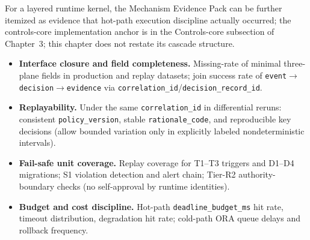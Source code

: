\documentclass[11pt,a4paper]{report}
\begin{document}
For a layered runtime kernel, the Mechanism Evidence Pack can be further itemized as evidence that hot-path execution discipline actually occurred; the controls-core implementation anchor is in the Controls-core subsection of Chapter~3; this chapter does not restate its cascade structure.
\begin{itemize}
  \item \textbf{Interface closure and field completeness.} Missing-rate of minimal three-plane fields in production and replay datasets; join success rate of \texttt{event}$\rightarrow$\texttt{decision}$\rightarrow$\texttt{evidence} via \texttt{correlation\_id}/\texttt{decision\_record\_id}.
  \item \textbf{Replayability.} Under the same \texttt{correlation\_id} in differential reruns: consistent \texttt{policy\_version}, stable \texttt{rationale\_code}, and reproducible key decisions (allow bounded variation only in explicitly labeled nondeterministic intervals).
  \item \textbf{Fail-safe unit coverage.} Replay coverage for T1--T3 triggers and D1--D4 migrations; S1 violation detection and alert chain; Tier-R2 authority-boundary checks (no self-approval by runtime identities).
  \item \textbf{Budget and cost discipline.} Hot-path \texttt{deadline\_budget\_ms} hit rate, timeout distribution, degradation hit rate; cold-path ORA queue delays and rollback frequency.
\end{itemize}
\end{document}
